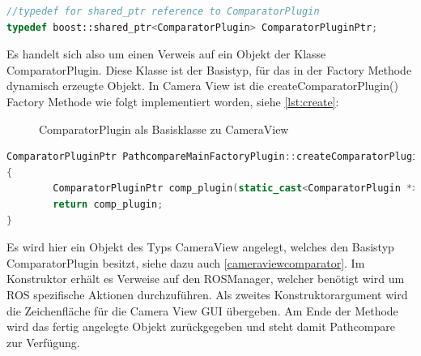 \begin{lstlisting}[caption=Typdefinition von CompoaratorPluginPtr, language=C++, basicstyle=\footnotesize, label=lst:returntypedef]
//typedef for shared_ptr reference to ComparatorPlugin
typedef boost::shared_ptr<ComparatorPlugin> ComparatorPluginPtr;
\end{lstlisting}

Es handelt sich also um einen Verweis auf ein Objekt der Klasse
ComparatorPlugin. Diese Klasse ist der Basistyp, für das in der Factory Methode
dynamisch erzeugte Objekt. In Camera View ist die createComparatorPlugin()
Factory Methode wie folgt implementiert worden, siehe \autoref{lst:create}:

 \begin{figure}[t]
   \begin{center}
   \end{center}
   \caption{ComparatorPlugin als Basisklasse zu CameraView}
   \label{fig:cameraviewcomparator}
 \end{figure}

\begin{lstlisting}[caption=Implementierung der createComparatorPlugin in Camera View, language=C++, basicstyle=\footnotesize, label=lst:create]
ComparatorPluginPtr PathcompareMainFactoryPlugin::createComparatorPlugin(ROSManager * ros_manager, QWidget *tab_widget) const
{
        ComparatorPluginPtr comp_plugin(static_cast<ComparatorPlugin *>(new CameraView(ros_manager, tab_widget)));
        return comp_plugin;
}
\end{lstlisting}

Es wird hier ein Objekt des Typs CameraView angelegt, welches den Basistyp
ComparatorPlugin besitzt, siehe dazu auch \autoref{cameraviewcomparator}. Im
Konstruktor erhält es Verweise auf den ROSManager, welcher benötigt wird um ROS
spezifische Aktionen durchzuführen. Als zweites Konstruktorargument wird die
Zeichenfläche für die Camera View GUI übergeben.  Am Ende der Methode wird das
fertig angelegte Objekt zurückgegeben und steht damit Pathcompare zur
Verfügung. 

